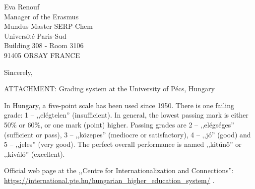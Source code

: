 \documentclass[11pt, a4paper]{letter} %
\begin{document}
\begin{letter}{

Eva Renouf \\
Manager of the Erasmus \\ \hspace{0.1 cm} Mundus Master SERP-Chem \\
Université Paris-Sud \\
Building 308 - Room 3106 \\
91405 ORSAY FRANCE \\
}
\closing{Sincerely,}




\newpage

\vspace{1cm}
\begin{flushleft} ATTACHMENT: Grading system at the University of Pécs, Hungary \end{flushleft}

\vspace{1cm}

In Hungary, a five-point scale has been used since 1950. There is one failing grade: 1 -- ,,elégtelen'' (insufficient). In general, the lowest passing mark is either 50\% or 60\%, or one mark (point) higher. Passing grades are 2 -- ,,elégséges'' (sufficient or pass), 3 -- ,,közepes'' (mediocre or satisfactory), 4 – ,,jó'' (good) and 5 -- ,,jeles'' (very good). The perfect overall performance is named ,,kitűnő'' or ,,kiváló'' (excellent).

Official web page at the ,,Centre for Internationalization and Connections'': \url{https://international.pte.hu/hungarian_higher_education_system/} . 

\end{letter}
\end{document}
